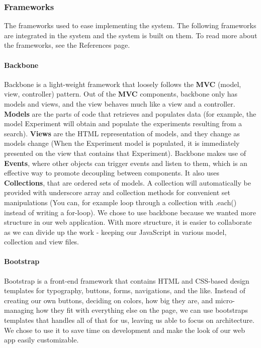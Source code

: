 \subsubsection{Frameworks}
\label{sec:web_frame}
The frameworks used to ease implementing the system. The following frameworks are integrated in the system and the system is built on them. To read more about the frameworks, see the References page.
\paragraph{Backbone}
Backbone\cite{web_1} is a light-weight framework that loosely follows the \textbf{MVC} (model, view, controller) pattern. Out of the \textbf{MVC} components, backbone only has models and views, and the view behaves much like a view and a controller. \textbf{Models} are the parts of code that retrieves and populates data (for example, the model Experiment will obtain and populate the experiments resulting from a search). \textbf{Views} are the HTML representation of models, and they change as models change (When the Experiment model is populated, it is immediately presented on the view that contains that Experiment).
Backbone makes use of \textbf{Events}, where other objects can trigger events and listen to them, which is an effective way to promote decoupling between components. It also uses \textbf{Collections}, that are ordered sets of models. A collection will automatically be provided with underscore array and collection methods for convenient set manipulations (You can, for example loop through a collection with .each() instead of writing a for-loop). We chose to use backbone because we wanted more structure in our web application. With more structure, it is easier to collaborate as we can divide up the work - keeping our JavaScript in various model, collection and view files.

\paragraph{Bootstrap}
Bootstrap\cite{web_2} is a front-end framework that contains HTML and CSS-based design templates for typography, buttons, forms, navigations, and the like. Instead of creating our own buttons, deciding on colors, how big they are, and micro-managing how they fit with everything else on the page, we can use bootstraps templates that handles all of that for us, leaving us able to focus on architecture. We chose to use it to save time on development and make the look of our web app easily customizable.

